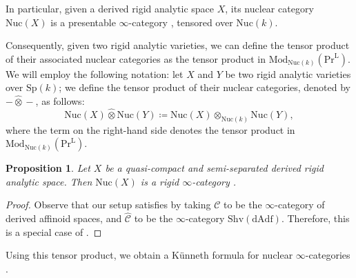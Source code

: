 \documentclass[oneside, hidelinks, 12pt, a4paper,reqno]{amsart}
\theoremstyle{plain}
\theoremstyle{definition}
\theoremstyle{plain}
\newtheorem{proposition}[proposition]{Proposition}
\newcommand{\rL}{\mathrm L}
\newcommand{\cC}{\mathscr C}
\newcommand{\Spk}{\mathrm{Sp}(k)}
\newcommand{\cat}{$\infty$-category }
\newcommand{\cates}{$\infty$-categories }
\newcommand{\LPr}{\mathrm{Pr}^\rL}
\newcommand{\Nuc}{\mathrm{Nuc}}
\newcommand{\Mod}{\mathrm{Mod}}
\newcommand{\cotimes}{\widehat{\otimes}}
\begin{document}
In particular, given a derived rigid analytic space $X$, its nuclear category $\Nuc(X)$ is a presentable \cat, tensored over $\Nuc(k)$.

Consequently, given two rigid analytic varieties, we can define the tensor product of their associated nuclear categories as the tensor product in $\Mod_{\Nuc(k)}(\LPr)$. We will employ the following notation: let $X$ and $Y$ be two rigid analytic varieties over $\Spk$; we define the tensor product of their nuclear categories, denoted by $-\cotimes-$, as follows:
\begin{equation*}
    \Nuc(X)\cotimes \Nuc(Y) \coloneqq \Nuc(X)\otimes_{\Nuc(k)}\Nuc(Y),
\end{equation*}
where the term on the right-hand side denotes the tensor product in $\Mod_{\Nuc(k)}(\LPr)$.

\begin{proposition}\label{prop: Nuc(X) is rigid}
    Let $X$ be a quasi-compact and semi-separated derived rigid analytic space. Then $\Nuc(X)$ is a rigid \cat.
\end{proposition}
\begin{proof}
    Observe that our setup satisfies \cite[Assumption 1.3.10]{montagnani2025axiomaticapproachanalytic1affineness} by taking $\cC$ to be the \cat of derived affinoid spaces, and $\widehat{\cC}$ to be the \cat $\mathrm{Shv}(\mathrm{dAdf})$. Therefore, this is a special case of \cite[Proposition 1.3.17]{montagnani2025axiomaticapproachanalytic1affineness}.
\end{proof}

Using this tensor product, we obtain a Künneth formula for nuclear \cates.
\end{document}
